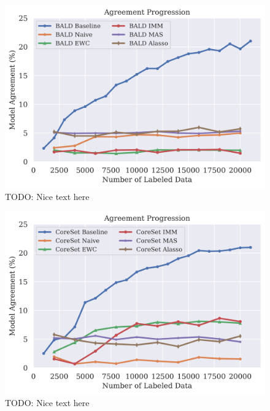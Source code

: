 \begin{figure}[h]
    \centering
    \includegraphics[width=0.8\linewidth]{images/results_CALMS/cifar100_label_bald.png}
    \caption[Agreement Comparison for Model Stealing on CIFAR100 using the top1-label and the Active Learning strategy BALD]{TODO: Nice text here}
    \label{fig:CALMSCIFAR100LabelBALD}
\end{figure}

\begin{figure}[h]
    \centering
    \includegraphics[width=0.8\linewidth]{images/results_CALMS/cifar100_label_coreset.png}
    \caption[Agreement Comparison for Model Stealing on CIFAR100 using the top1-label and the Active Learning strategy CoreSet]{TODO: Nice text here}
    \label{fig:CALMSCIFAR100LabelCoreSet}
\end{figure}


